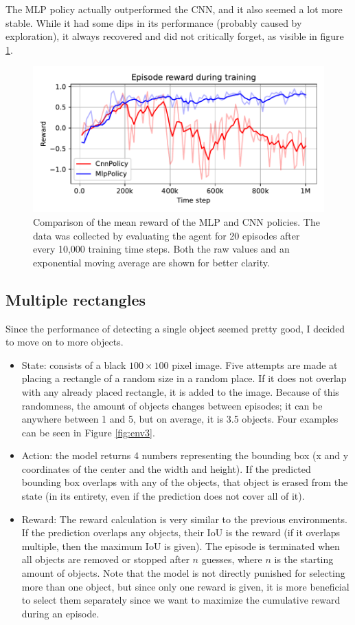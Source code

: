 \documentclass[
  digital,     %
  oneside,     %
  nosansbold,  %
  nocolorbold, %
  lof,         %
  lot,         %
]{fithesis4}
\begin{document}
The MLP policy actually outperformed the CNN, and it also seemed a lot more stable. While it had some dips in its performance (probably caused by exploration), it always recovered and did not critically forget, as visible in figure \ref{fig:v2_mlp_cnn}.

\begin{figure}
    \includegraphics[width=1\linewidth]{graphs/v2_mpl_cnn.pdf}
    \caption{Comparison of the mean reward of the MLP and CNN policies. The data was collected by evaluating the agent for 20 episodes after every 10,000 training time steps. Both the raw values and an exponential moving average are shown for better clarity.}
    \label{fig:v2_mlp_cnn}
\end{figure}

\subsection{Multiple rectangles}
\label{subsec:multi-rect}
Since the performance of detecting a single object seemed pretty good, I decided to move on to more objects.
\begin{itemize}
    \item State: consists of a black $100\times100$ pixel image. Five attempts are made at placing a rectangle of a random size in a random place. If it does not overlap with any already placed rectangle, it is added to the image. Because of this randomness, the amount of objects changes between episodes; it can be anywhere between 1 and 5, but on average, it is 3.5 objects. Four examples can be seen in Figure \ref{fig:env3}.
    \item Action: the model returns 4 numbers representing the bounding box (x and y coordinates of the center and the width and height). If the predicted bounding box overlaps with any of the objects, that object is erased from the state (in its entirety, even if the prediction does not cover all of it).
    \item Reward: The reward calculation is very similar to the previous environments. If the prediction overlaps any objects, their IoU is the reward (if it overlaps multiple, then the maximum IoU is given). The episode is terminated when all objects are removed or stopped after $n$ guesses, where $n$ is the starting amount of objects. Note that the model is not directly punished for selecting more than one object, but since only one reward is given, it is more beneficial to select them separately since we want to maximize the cumulative reward during an episode.
\end{itemize}
\end{document}

